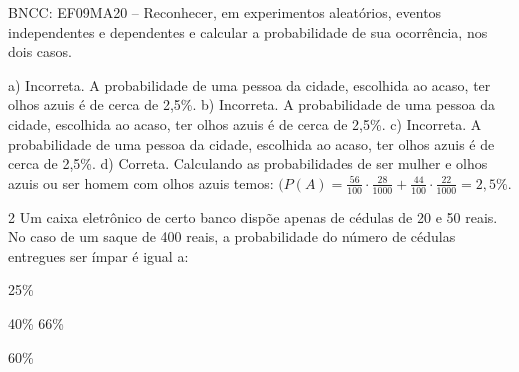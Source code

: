 \begin{escolha}
\begin{escolha}
\begin{escolha}
\begin{escolha}
{\begin{boxmedio}
\begin{boxpeq}
\begin{q°}
\begin{boxmedio}
\begin{boxpeq}
\begin{boxpeq}
\begin{boxmedio}
\begin{boxmedio}
\begin{boxmedio}
\begin{largebox}
\begin{boxmedio}
{\begin{enumerate}
\begin{boxpeq}
{\begin{boxpeq}
\begin{boxpeq}
\begin{boxmedio}
\begin{boxpeq}
\begin{boxpeq}
\begin{boxpeq}
{BNCC: EF09MA20 -- Reconhecer, em experimentos aleatórios, eventos independentes
e dependentes e calcular a probabilidade de sua ocorrência, nos dois casos.

a) Incorreta. A probabilidade de uma pessoa da cidade, escolhida ao acaso, ter olhos azuis 
é de cerca de 2,5\%.
b) Incorreta. A probabilidade de uma pessoa da cidade, escolhida ao acaso, ter olhos azuis 
é de cerca de 2,5\%.
c) Incorreta. A probabilidade de uma pessoa da cidade, escolhida ao acaso, ter olhos azuis 
é de cerca de 2,5\%.
d) Correta. Calculando as probabilidades de ser mulher e olhos azuis ou ser homem
com olhos azuis temos: $(P(A) = \frac{56}{100} \cdot \frac{28}{1000} + \frac{44}{100} \cdot \frac{22}{1000} = 2,5\%$.}

\num{2} Um caixa eletrônico de certo banco dispõe apenas de cédulas de 20 e 50
reais. No caso de um saque de 400 reais, a probabilidade do número de
cédulas entregues ser ímpar é igual a:

\begin{escolha}

  \item 25\%

  \item 40\%
66\%

  \item 60\%

\end{escolha}

\end{boxpeq}
\end{boxpeq}
\end{boxpeq}
\end{boxmedio}
\end{boxpeq}
\end{boxpeq}}
\end{boxpeq}
\end{enumerate}}
\end{boxmedio}
\end{largebox}
\end{boxmedio}
\end{boxmedio}
\end{boxmedio}
\end{boxpeq}
\end{boxpeq}
\end{boxmedio}
\end{q°}
\end{boxpeq}
\end{boxmedio}}
\end{escolha}
\end{escolha}
\end{escolha}
\end{escolha}
